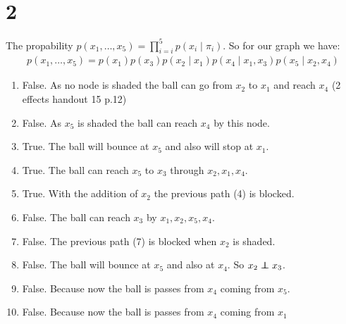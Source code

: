 \section*{2}
The propability $p(x_1,\dotsc,x_5) = \prod_{i=i}^5 p(x_i\mid \pi_i)$.
So for our graph we have:
\begin{align*}
p(x_1,\dotsc,x_5) = p(x_1)p(x_3)p(x_2\mid x_1)p(x_4\mid x_{1},x_3)p(x_5\mid x_{2},x_4)
\end{align*}
\begin{enumerate}
\item False. As no node is shaded the ball can go from $x_2$ to $x_1$ and reach $x_4$ (2 effects handout 15 p.12)
\item False. As $x_5$ is shaded the ball can reach $x_4$ by this node.
\item True. The ball will bounce at $x_5$ and also will stop at $x_1$.
\item True. The ball can reach $x_5$ to $x_3$ through $x_2, x_1, x_4$.
\item True. With the addition of $x_2$ the previous path (4) is blocked.
\item False. The ball can reach $x_3$ by $x_1, x_2, x_5, x_4$.
\item False. The previous path (7) is blocked when $x_2$ is shaded.
\item False. The ball will bounce at $x_5$ and also at $x_4$. So $x_2 \independent x_3$. 
\item False. Because now the ball is passes from $x_4$ coming from $x_5$.
\item False. Because now the ball is passes from $x_4$ coming from $x_1$
\end{enumerate}
